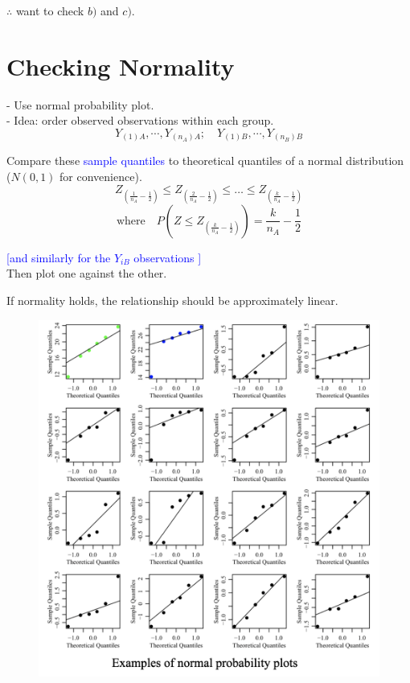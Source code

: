 \documentclass[14pt]{extarticle}
\begin{document}
$\therefore$ want to check $b)$ and $c)$.

\section*{Checking Normality}
- Use normal probability plot.\\
- Idea: order observed observations within each group.
\[
Y_{(1)A}, \cdots , Y_{(n_A)A}; \quad Y_{(1)B}, \cdots , Y_{(n_B)B}
\]

\noindent Compare these \textcolor{blue}{sample quantiles} to theoretical quantiles of a normal distribution ($N(0, 1)$ for convenience).
\[
Z_{\left( \frac{1}{n_A} - \frac{1}{2} \right)} \leq Z_{\left( \frac{2}{n_A} - \frac{1}{2} \right)} \leq \dots \leq Z_{\left( \frac{k}{n_A} - \frac{1}{2} \right)}
\]
\[\text{where} \quad P\left(Z \leq Z_{\left(\frac{k}{n_A} - \frac{1}{2}\right)}\right) = \frac{k}{n_A} - \frac{1}{2}
\]

\textcolor{blue}{[and similarly for the \(Y_{iB}\) observations ]} \\

Then plot one against the other. 

If normality holds, the relationship should be approximately linear.\\

\begin{figure}[H]
    \centering
    \includegraphics[width=1\textwidth]{fig19.png}
\end{figure}
\end{document}

